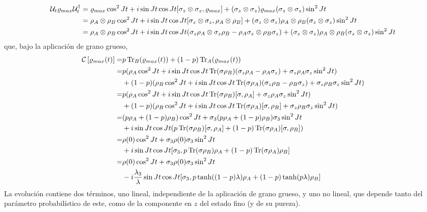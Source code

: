 \begin{align*}
    \mathcal{U}_{t}\varrho_{max}\mathcal{U}_{t}^{\dag}&=\varrho_{max}\cos^{2}{Jt}+i\sin{Jt}\cos{Jt}[\sigma_{z}\otimes\sigma_{z},\varrho_{max}]+(\sigma_{z}\otimes\sigma_{z}) \varrho_{max} (\sigma_{z}\otimes\sigma_{z}) \sin^{2}{Jt}\\
    &=\rho_{A}\otimes\rho_{B}\cos^{2}{Jt}+i\sin{Jt}\cos{Jt}[\sigma_{z}\otimes\sigma_{z},\rho_{A}\otimes\rho_{B}]+(\sigma_{z}\otimes\sigma_{z}) \rho_{A}\otimes\rho_{B} (\sigma_{z}\otimes\sigma_{z}) \sin^{2}{Jt}\\
    &=\rho_{A}\otimes\rho_{B}\cos^{2}{Jt}+i\sin{Jt}\cos{Jt}(\sigma_{z}\rho_{A}\otimes\sigma_{z}\rho_{B} - \rho_{A}\sigma_{z}\otimes\rho_{B}\sigma_{z})+(\sigma_{z}\otimes\sigma_{z}) \rho_{A}\otimes\rho_{B} (\sigma_{z}\otimes\sigma_{z}) \sin^{2}{Jt}
\end{align*}
que, bajo la aplicación de grano grueso,
\begin{align*}
    \mathcal{C}\left[\varrho_{max}(t)\right]=&p\Tr_{B}(\varrho_{max}(t))+(1-p)\Tr_{A}(\varrho_{max}(t))\\
    =&p(\rho_{A}\cos^{2}{Jt}+i\sin{Jt}\cos{Jt}\Tr(\sigma \rho_{B})(\sigma_{z}\rho_{A}- \rho_{A}\sigma_{z})+\sigma_{z}\rho_{A}\sigma_{z}\sin^{2}{Jt})\\
    &+(1-p)(\rho_{B}\cos^{2}{Jt}+i\sin{Jt}\cos{Jt}\Tr(\sigma \rho_{A})(\sigma_{z}\rho_{B}- \rho_{B}\sigma_{z})+\sigma_{z}\rho_{B}\sigma_{z}\sin^{2}{Jt})\\
    =&p(\rho_{A}\cos^{2}{Jt}+i\sin{Jt}\cos{Jt}\Tr(\sigma \rho_{B})[\sigma,\rho_{A}]+\sigma_{z}\rho_{A}\sigma_{z}\sin^{2}{Jt})\\
    &+(1-p)(\rho_{B}\cos^{2}{Jt}+i\sin{Jt}\cos{Jt}\Tr(\sigma \rho_{A})[\sigma,\rho_{B}]+\sigma_{z}\rho_{B}\sigma_{z}\sin^{2}{Jt})\\
    =&(p\rho_{A}+(1-p)\rho_{B})\cos^{2}{Jt}+\sigma_{3}(p\rho_{A}+(1-p)\rho_{B})\sigma_{3}\sin^{2}{Jt}\\
    &+i\sin{Jt}\cos{Jt}(p\Tr(\sigma \rho_{B})[\sigma,\rho_{A}]+(1-p)\Tr(\sigma \rho_{A})[\sigma,\rho_{B}])\\
    =&\rho(0)\cos^{2}{Jt}+\sigma_{3}\rho(0)\sigma_{3}\sin^{2}{Jt}\\
    &+i\sin{Jt}\cos{Jt}[\sigma_{3},p\Tr(\sigma \rho_{B})\rho_{A}+(1-p)\Tr(\sigma \rho_{A})\rho_{B}]\\
    =&\rho(0)\cos^{2}{Jt}+\sigma_{3}\rho(0)\sigma_{3}\sin^{2}{Jt}\\
    &-i\frac{\lambda_{3}}{\lambda}\sin{Jt}\cos{Jt}[\sigma_{3},p\tanh((1-p)\lambda)\rho_{A}+(1-p)\tanh(p\lambda)\rho_{B}]
\end{align*}	
La evolución contiene dos términos, uno lineal, independiente de la aplicación de grano grueso, y uno no lineal, que depende tanto del parámetro probabilístico de este, como de la componente en $z$ del estado fino (y de su pureza). 